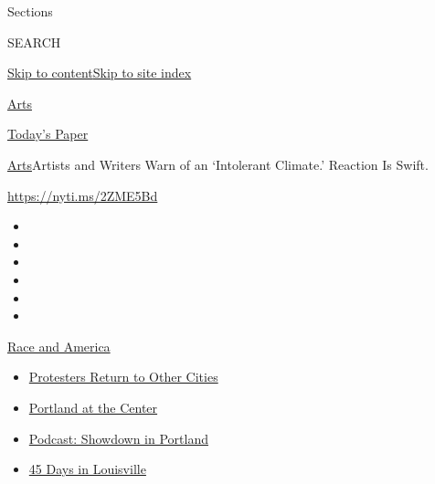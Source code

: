 Sections

SEARCH

\protect\hyperlink{site-content}{Skip to
content}\protect\hyperlink{site-index}{Skip to site index}

\href{https://www.nytimes.com/section/arts}{Arts}

\href{https://myaccount.nytimes.com/auth/login?response_type=cookie\&client_id=vi}{}

\href{https://www.nytimes.com/section/todayspaper}{Today's Paper}

\href{/section/arts}{Arts}\textbar{}Artists and Writers Warn of an
`Intolerant Climate.' Reaction Is Swift.

\url{https://nyti.ms/2ZME5Bd}

\begin{itemize}
\item
\item
\item
\item
\item
\item
\end{itemize}

\href{https://www.nytimes.com/news-event/george-floyd-protests-minneapolis-new-york-los-angeles?action=click\&pgtype=Article\&state=default\&region=TOP_BANNER\&context=storylines_menu}{Race
and America}

\begin{itemize}
\tightlist
\item
  \href{https://www.nytimes.com/2020/07/26/us/protests-portland-seattle-trump.html?action=click\&pgtype=Article\&state=default\&region=TOP_BANNER\&context=storylines_menu}{Protesters
  Return to Other Cities}
\item
  \href{https://www.nytimes.com/2020/07/24/us/portland-oregon-protests-white-race.html?action=click\&pgtype=Article\&state=default\&region=TOP_BANNER\&context=storylines_menu}{Portland
  at the Center}
\item
  \href{https://www.nytimes.com/2020/07/23/podcasts/the-daily/portland-protests.html?action=click\&pgtype=Article\&state=default\&region=TOP_BANNER\&context=storylines_menu}{Podcast:
  Showdown in Portland}
\item
  \href{https://www.nytimes.com/interactive/2020/07/16/us/black-lives-matter-protests-louisville-breonna-taylor.html?action=click\&pgtype=Article\&state=default\&region=TOP_BANNER\&context=storylines_menu}{45
  Days in Louisville}
\end{itemize}

